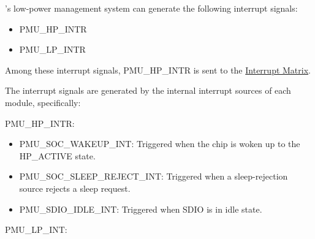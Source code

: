 \documentclass[main\_\_EN.tex]{subfiles}
\begin{document}
\chipname{}'s low-power management system can generate the following interrupt signals:

\begin{itemize}
    \item PMU\_HP\_INTR
    \item PMU\_LP\_INTR
\end{itemize}

Among these interrupt signals, PMU\_HP\_INTR is sent to the \hyperref[mod:intmtrx]{Interrupt Matrix}.

The interrupt signals are generated by the internal interrupt sources of each module, specifically:

PMU\_HP\_INTR:

\begin{itemize}
\item \label{int:PMUSOCWAKEUPINT}PMU\_SOC\_WAKEUP\_INT: Triggered when the chip is woken up to the HP\_ACTIVE state.
\item \label{int:PMUSOCSLEEPREJECTINT}PMU\_SOC\_SLEEP\_REJECT\_INT: Triggered when a sleep-rejection source rejects a sleep request.


\item \label{int:PMUSDIOIDLEINT}PMU\_SDIO\_IDLE\_INT: Triggered when SDIO is in idle state.
\end{itemize}

PMU\_LP\_INT:
\end{document}

